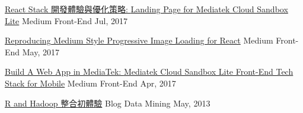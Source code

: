 \begin{cvhonors}
  \cvhonor
    {\href{https://medium.com/@evenchange4/react-stack-\%E9\%96\%8B\%E7\%99\%BC\%E9\%AB\%94\%E9\%A9\%97\%E8\%88\%87\%E5\%84\%AA\%E5\%8C\%96\%E7\%AD\%96\%E7\%95\%A5-b056da2fa0aa}{React Stack 開發體驗與優化策略: \textmd{Landing Page for Mediatek Cloud Sandbox Lite}}} %
    {Medium} %
    {Front-End} %
    {Jul, 2017} %

  \cvhonor
    {\href{https://medium.com/@evenchange4/reproducing-medium-style-progressive-image-loading-for-react-2e83bba0c608}{Reproducing Medium Style Progressive Image Loading for React}} %
    {Medium} %
    {Front-End} %
    {May, 2017} %

  \cvhonor
    {\href{https://medium.com/@evenchange4/build-a-web-app-in-mediatek-61b0a26215a0}{Build A Web App in MediaTek: \textmd{Mediatek Cloud Sandbox Lite Front-End Tech Stack for Mobile}}} %
    {Medium} %
    {Front-End} %
    {Apr, 2017} %

  \cvhonor
    {\href{https://old.michaelhsu.tw/2013/05/01/r-and-hadoop-\%E5\%88\%9D\%E9\%AB\%94\%E9\%A9\%97/}{R and Hadoop 整合初體驗}} %
    {Blog} %
    {Data Mining} %
    {May, 2013} %


\end{cvhonors}
